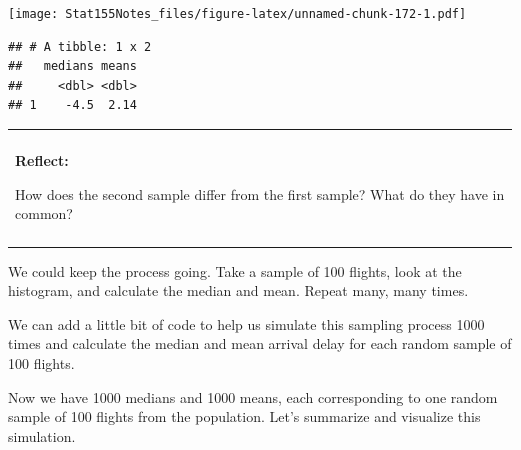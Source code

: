 \documentclass[]{book}
\newenvironment{Shaded}{\begin{snugshade}}{\end{snugshade}}
\newcommand{\CommentTok}[1]{\textcolor[rgb]{0.56,0.35,0.01}{\textit{#1}}}
\newcommand{\DataTypeTok}[1]{\textcolor[rgb]{0.13,0.29,0.53}{#1}}
\newcommand{\DecValTok}[1]{\textcolor[rgb]{0.00,0.00,0.81}{#1}}
\newcommand{\KeywordTok}[1]{\textcolor[rgb]{0.13,0.29,0.53}{\textbf{#1}}}
\newcommand{\NormalTok}[1]{#1}
\newcommand{\OperatorTok}[1]{\textcolor[rgb]{0.81,0.36,0.00}{\textbf{#1}}}
\newcommand{\StringTok}[1]{\textcolor[rgb]{0.31,0.60,0.02}{#1}}
\newenvironment{reflect}
{
    \begin{center}
    
    \begin{tabular}{|p{0.8\textwidth}|}
    \rowcolor{LightBlue}
    \hline\\
    \rowcolor{LightBlue}
    \textbf{Reflect:}
}
{
    \\\rowcolor{LightBlue}
    \\\hline
    \end{tabular} 
    \end{center}
}
\begin{document}
\texttt{[image: Stat155Notes\_files/figure-latex/unnamed-chunk-172-1.pdf]}

\begin{Shaded}
\end{Shaded}

\begin{verbatim}
## # A tibble: 1 x 2
##   medians means
##     <dbl> <dbl>
## 1    -4.5  2.14
\end{verbatim}

\begin{reflect}
How does the second sample differ from the first sample? What do they
have in common?
\end{reflect}

We could keep the process going. Take a sample of 100 flights, look at the histogram, and calculate the median and mean. Repeat many, many times.

We can add a little bit of code to help us simulate this sampling process 1000 times and calculate the median and mean arrival delay for each random sample of 100 flights.

\begin{Shaded}
\end{Shaded}

Now we have 1000 medians and 1000 means, each corresponding to one random sample of 100 flights from the population. Let's summarize and visualize this simulation.
\end{document}
